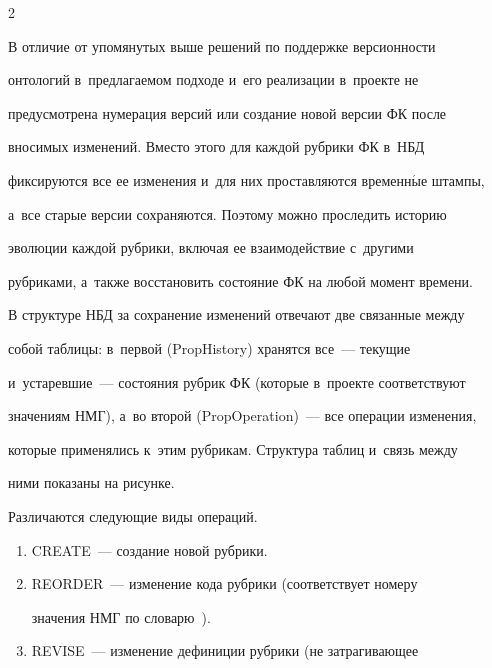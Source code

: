 \begin{multicols}{2}
\vspace*{-2pt}





В отличие от упомянутых выше решений по поддержке версионности 


онтологий в~предлагаемом подходе и~его реализации в~проекте не 


предусмот\-ре\-на нумерация версий или создание новой версии ФК после 


вносимых изменений. Вместо этого для каждой рубрики ФК в~НБД 


фиксируются все ее изменения и~для них проставляются временн$\acute{\mbox{ы}}$е штампы, 


а~все старые версии сохраняются. Поэтому можно проследить историю 


эволюции каждой рубрики, включая ее взаимодействие с~другими 


руб\-ри\-ка\-ми, а~также восстановить состояние ФК на любой момент времени.





В структуре НБД за сохранение изменений отвечают две связанные между 


собой таблицы: в~первой (PropHistory) хранятся все~--- текущие 


и~устаревшие~--- состояния рубрик ФК (которые в~проекте соответствуют 


значениям НМГ), а~во второй (\mbox{PropOperation})~--- все операции изменения, 


которые применялись к~этим рубрикам. Структура таблиц и~связь между 


ними показаны на рисунке.











Различаются следующие виды операций. 


\begin{enumerate}[1.]


\item CREATE~--- создание новой рубрики.


\item REORDER~--- изменение кода рубрики (соответствует номеру 


значения НМГ по словарю~\cite{17-gon}).


\item REVISE~--- изменение дефиниции рубрики (не затрагивающее 



\end{enumerate}
\end{multicols}
